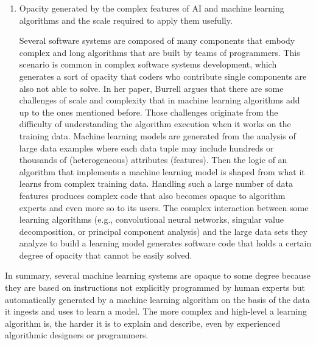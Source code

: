 \begin{enumerate}
\item Opacity generated by the complex features of AI and machine learning algorithms and the scale required to apply them usefully.

Several software systems are composed of many components that embody complex and long algorithms that are built by teams of programmers. This scenario is common in complex software systems development, which generates a sort of opacity that coders who contribute single components are also not able to solve. In her paper, Burrell argues that there are some challenges of scale and complexity that in machine learning algorithms add up to the ones mentioned before. Those challenges originate from the difficulty of understanding the algorithm execution when it works on the training data. Machine learning models are generated from the analysis of large data examples where each data tuple may include hundreds or thousands of (heterogeneous) attributes (features). Then the logic of an algorithm that implements a machine learning model is shaped from what it learns from complex training data. Handling such a large number of data features produces complex code that also becomes opaque to algorithm experts and even more so to its users. The complex interaction between some learning algorithms (e.g., convolutional neural networks, singular value decomposition, or principal component analysis) and the large data sets they analyze to build a learning model generates software code that holds a certain degree of opacity that cannot be easily solved.\vspace*{-1pt}
\end{enumerate}
\egroup

In summary, several machine learning systems are opaque to some degree because they are based on instructions not explicitly programmed by human experts but automatically generated by a machine learning algorithm on the basis of the data it ingests and uses to learn a model. The more complex and high-level a learning algorithm is, the harder it is to explain and describe, even by experienced algorithmic designers or programmers.

